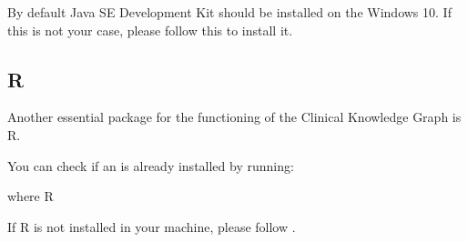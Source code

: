 \documentclass[letterpaper,10pt,english]{sphinxmanual}
\begin{document}
By default Java SE Development Kit should be installed on the Windows 10. If this is not your case, please follow this  to install it.


\subsection{R}
\label{\detokenize{intro/getting-started-with-windows:r}}
Another essential package for the functioning of the Clinical Knowledge Graph is R.

You can check if an  is already installed by running:

\begin{sphinxVerbatim}[commandchars=\\\{\}]
\PYGZgt{} where R
\end{sphinxVerbatim}

If R is not installed in your machine, please follow .
\end{document}
